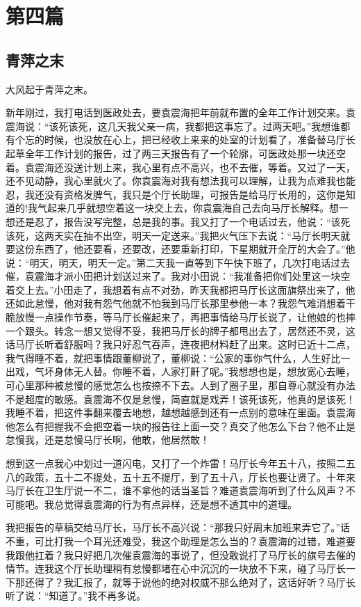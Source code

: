 \documentclass[12pt,oneside]{book}
\begin{document}
\part{第四篇}
\chapter{青萍之末}
大风起于青萍之末。

新年刚过，我打电话到医政处去，要袁震海把年前就布置的全年工作计划交来。袁震海说：``该死该死，这几天我父亲一病，我都把这事忘了。过两天吧。''我想谁都有个忘的时候，也没放在心上，把已经收上来来的处室的计划看了，准备替马厅长起草全年工作计划的报告，过了两三天报告有了一个轮廓，可医政处那一块还空着。袁震海还没送计划上来，我心里有点不高兴，也不去催，等着。又过了一天，还不见动静，我心里就火了。你袁震海对我有想法我可以理解，让我为点难我也能忍，我还没有资格发脾气，我只是个厅长助理，可报告是给马厅长用的，这你是知道的!我气起来几乎就想空着这一块交上去，你袁震海自己去向马厅长解释。想一想还是忍了，报告没写完整，总是我的事。我又打了一个电话过去，他说：``该死该死，这两天实在抽不出空，明天一定送来。''我把火气压下去说：``马厅长明天就要这份东西了，他还要看，还要改，还要重新打印，下星期就开全厅的大会了。''他说：``明天，明天，明天一定。''第二天我一直等到下午快下班了，几次打电话过去催，袁震海才派小田把计划送过来了。我对小田说：``我准备把你们处里这一块空着交上去。''小田走了，我想着有点不对劲，昨天我都把马厅长这面旗祭出来了，他还如此怠慢，他对我有怨气他就不怕我到马厅长那里参他一本？我怨气难消想着干脆放慢一点操作节奏，等马厅长催起来了，再把事情给马厅长说了，让他娘的也摔一个跟头。转念一想又觉得不妥，我把马厅长的牌子都甩出去了，居然还不灵，这话马厅长听着舒服吗？我只好忍气吞声，连夜把材料赶了出来。这时已近十二点，我气得睡不着，就把事情跟董柳说了，董柳说：``公家的事你气什么，人生好比一出戏，气坏身体无人替。你睡不着，人家打鼾了呢。''我想想也是，想放宽心去睡，可心里那种被怠慢的感觉怎么也按捺不下去。人到了圈子里，那自尊心就没有办法不是超度的敏感。袁震海不仅是怠慢，简直就是戏弄！该死该死，他真的是该死！我睡不着，把这件事翻来覆去地想，越想越感到还有一点别的意味在里面。袁震海他怎么有把握我不会把空着一块的报告往上面一交？真交了他怎么下台？他不止是怠慢我，还是怠慢马厅长啊，他敢，他居然敢！

想到这一点我心中划过一道闪电，又打了一个炸雷！马厅长今年五十八，按照二五八的政策，五十二不提处，五十五不提厅，到了五十八，厅长也要让贤了。十年来马厅长在卫生厅说一不二，谁不拿他的话当圣旨？难道袁震海听到了什么风声？不可能吧。我总觉得袁震海的行为有点异样，还是想不透其中的道理。

我把报告的草稿交给马厅长，马厅长不高兴说：``那我只好周末加班来弄它了。''话不重，可比打我一个耳光还难受，我这个助理是怎么当的？袁震海的过错，难道要我跟他扛着？我只好把几次催袁震海的事说了，但没敢说打了马厅长的旗号去催的情节。连我这个厅长助理稍有怠慢都堵在心中沉沉的一块放不下来，碰了马厅长一下那还得了？我汇报了，就等于说他的绝对权威不那么绝对了，这话好听？马厅长听了说：``知道了。''我不再多说。
\end{document}
